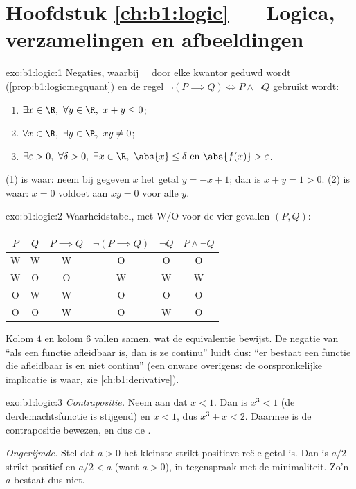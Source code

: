 \section*{Hoofdstuk \ref{ch:b1:logic} --- Logica, verzamelingen en afbeeldingen}

\begin{solution}{exo:b1:logic:1}
Negaties, waarbij $\lnot$ door elke kwantor geduwd wordt
(\cref{prop:b1:logic:negquant}) en de regel $\lnot(P \implies Q) \iff
P \land \lnot Q$ gebruikt wordt:
\begin{enumerate}
  \item $\exists x \in \R,\ \forall y \in \R,\ x + y \leq 0$;
  \item $\forall x \in \R,\ \exists y \in \R,\ xy \neq 0$;
  \item $\exists \varepsilon > 0,\ \forall \delta > 0,\ \exists x \in
        \R,\ \abs{x} \leq \delta \text{ en } \abs{f(x)} >
        \varepsilon$.
\end{enumerate}
 (1) is waar: neem bij gegeven $x$ het getal $y = -x + 1$; dan
is $x + y = 1 > 0$.  (2) is waar: $x = 0$ voldoet aan $xy = 0$
voor alle $y$.
\end{solution}

\begin{solution}{exo:b1:logic:2}
Waarheidstabel, met W/O voor de vier gevallen $(P, Q)$:
\begin{center}
\begin{tabular}{cc|c|c|c|c}
$P$ & $Q$ & $P \implies Q$ & $\lnot(P \implies Q)$ & $\lnot Q$ &
$P \land \lnot Q$ \\
\hline
W & W & W & O & O & O \\
W & O & O & W & W & W \\
O & W & W & O & O & O \\
O & O & W & O & W & O \\
\end{tabular}
\end{center}
Kolom $4$ en kolom $6$ vallen samen, wat de equivalentie bewijst. De
negatie van ``als een functie afleidbaar is, dan is ze continu'' luidt
dus: ``er bestaat een functie die afleidbaar is en niet continu'' (een
onware  overigens: de oorspronkelijke implicatie is waar, zie
\cref{ch:b1:derivative}).
\end{solution}

\begin{solution}{exo:b1:logic:3}
\emph{Contrapositie.} Neem aan dat $x < 1$. Dan is $x^3 < 1$ (de
derdemachtsfunctie is stijgend) en $x < 1$, dus $x^3 + x < 2$. Daarmee
is de contrapositie bewezen, en dus de .

\emph{Ongerijmde.} Stel dat $a > 0$ het kleinste strikt positieve reële
getal is. Dan is $a/2$ strikt positief en $a/2 < a$ (want $a > 0$), in
tegenspraak met de minimaliteit. Zo'n $a$ bestaat dus niet.
\end{solution}

